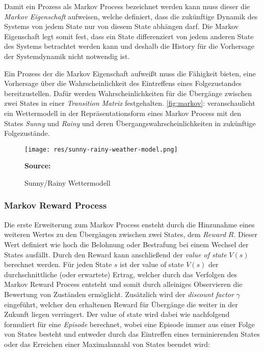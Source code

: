 \documentclass[11pt]{scrartcl}
\newcommand{\source}[1]{\vspace{-5pt} \caption*{\hfill \textbf{Source:} {#1}} }
\begin{document}
Damit ein Prozess als Markov Process bezeichnet werden kann muss dieser die \textit{Markov Eigenschaft}
aufweisen, welche definiert, dass die zukünftige Dynamik des Systems von jedem State nur
von diesem State abhängen darf. Die Markov Eigenschaft legt somit fest, dass ein State
differenziert von jedem anderen State des Systems betrachtet werden kann und deshalb die
History für die Vorhersage der Systemdynamik nicht notwendig ist.

Ein Prozess der die Markov Eigenschaft aufweißt muss die Fähigkeit bieten, eine Vorhersage über
die Wahrscheinlichkeit des Eintreffens eines Folgezustandes bereitzustellen. Dafür werden 
Wahrscheinlichkeiten für die Übergänge zwischen zwei States in einer \textit{Transition Matrix}
festgehalten. \autoref{fig:markov}:  veranschaulicht ein Wettermodell in 
der Repräsentationsform eines Markov Process mit den States \textit{Sunny} und \textit{Rainy}
und deren Übergangswahrscheinlichkeiten in zukünftige Folgezustände.

\begin{figure}[htp]
\centering
\texttt{[image: res/sunny-rainy-weather-model.png]}
\caption{Sunny/Rainy Wettermodell}
\source{\cite[~S.13 - Chapter 1 - Figure 4]{L2018}}
\label{fig:markov}
\end{figure}


\subsubsection{Markov Reward Process}
\label{sec:markov_reward_process}
Die erste Erweiterung zum Markov Process ensteht durch die Hinzunahme eines weiteren Wertes zu den 
Übergängen zwischen zwei States, dem \textit{Reward} $R$. Dieser Wert definiert wie hoch die Belohnung
oder Bestrafung bei einem Wechsel der States ausfällt. Durch den Reward kann anschließend der
\textit{value of state} $V(s)$ berechnet werden. Für jeden State $s$ ist der value of state $V(s)$
der durchschnittliche (oder erwartete) Ertrag, welcher durch das Verfolgen des Markov Reward Process
entsteht und somit durch alleiniges Observieren die Bewertung von Zuständen ermöglicht.
Zusätzlich wird der \textit{discount factor} $\gamma$ eingeführt, welcher den erhaltenen Reward
für Übergänge die weiter in der Zukunft liegen verringert. Der value of state wird dabei wie
nachfolgend formuliert für eine \textit{Episode} berechnet, wobei eine Episode immer aus einer
Folge von States besteht und entweder durch das Eintreffen eines terminierenden States oder das
Erreichen einer Maximalanzahl von States beendet wird:
\end{document}
